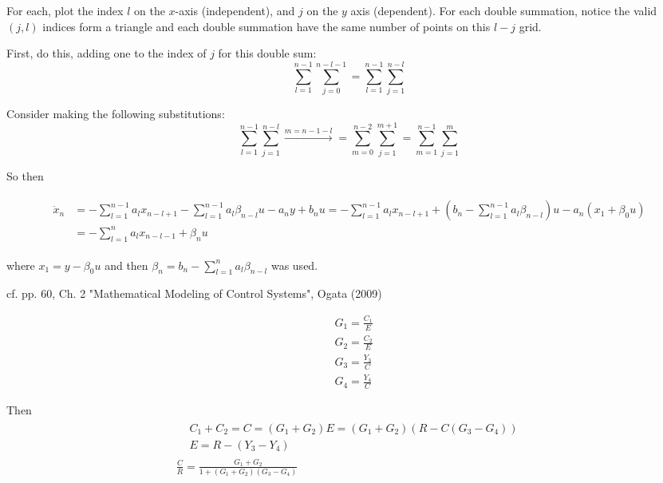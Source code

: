 \documentclass[10pt]{amsart}
\newcommand{\problemhead}[1]
  {
   \noindent{\small\bf Problem #1.}
   }
\begin{document}
\begin{multicols*}{2}
For each, plot the index $l$ on the $x$-axis (independent), and $j$ on the $y$ axis (dependent). For each double summation, notice the valid $(j, l)$ indices form a triangle and each double summation have the same number of points on this $l-j$ grid. 

First, do this, adding one to the index of $j$ for this double sum:
\[
\sum_{l=1}^{n-1} \sum_{j=0}^{n-l-1} = \sum_{l=1}^{n-1} \sum_{j=1}^{n-l}
\]

Consider making the following substitutions:
\[
\sum_{l=1}^{n-1} \sum_{j=1}^{n-l}  \xrightarrow{m = n-1 - l} = \sum_{m=0}^{n-2} \sum_{j=1}^{m+1}  = \sum_{m=1}^{n-1} \sum_{j=1}^m
\]

So then 

\[
\begin{gathered}
	\begin{aligned}
		\dot{x}_n & = -\sum_{l=1}^{n-1} a_l x_{n-l + 1} - \sum_{l=1}^{n-1} a_l \beta_{n-l} u - a_n y + b_n u = -\sum_{l=1}^{n-1} a_l x_{n-l+1} + \left( b_n - \sum_{l=1}^{n-1} a_l \beta_{n-l} \right) u - a_n (x_1 + \beta_0 u) \\
		& = -\sum_{l=1}^n a_l x_{n-l-1} + \beta_n u
	\end{aligned}
\end{gathered}
\]

where $x_1 = y-\beta_0 u$ and then $\beta_n = b_n - \sum_{l=1}^n a_l \beta_{n-l}$ was used.






\problemhead{B-2-1} cf. pp. 60, Ch. 2 "Mathematical Modeling of Control Systems", Ogata (2009) \cite{Ogat2009}

\[
\begin{aligned}
& G_1 = \frac{C_1}{E} \\
& G_2 = \frac{C_2}{E} \\
& G_3 = \frac{Y_3}{C} \\
& G_4 = \frac{Y_4}{C} 
\end{aligned}
\]

Then
\[
\begin{gathered}
\begin{aligned}
& C_1 + C_2 = C = (G_1 + G_2)E = (G_1 + G_2)(R - C (G_3  - G_4) ) \\ 
& E = R-(Y_3 - Y_4)
\end{aligned} \\
\boxed{ \frac{C}{R} = \frac{G_1 + G_2}{ 1 + (G_1 + G_2)(G_3 - G_4) } }
\end{gathered}
\]



\end{multicols*}
\end{document}
